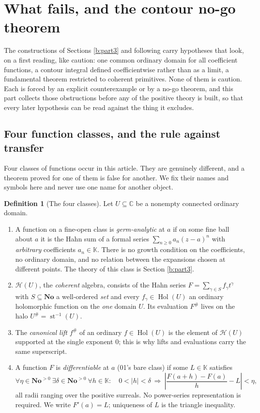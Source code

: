 \documentclass[11pt,a4paper]{article}
\numberwithin{equation}{section}
\theoremstyle{definition}
\newtheorem{definition}[theorem]{Definition}
\theoremstyle{remark}
\theoremstyle{plain}
\newcommand{\K}{\mathbb K}
\newcommand{\No}{\mathbf{No}}
\newcommand{\CC}{\mathbb C}
\DeclareMathOperator{\Hol}{Hol}
\DeclareMathOperator{\st}{st}
\newcommand{\tm}{t}
\newcommand{\halo}[1]{#1^{\#}}
\newcommand{\ev}[1]{#1^{\#}}
\newcommand{\Hc}{\mathcal H}
\newcommand{\abs}[1]{\lvert #1\rvert}
\begin{document}
\section{What fails, and the contour no-go theorem}
\label{b:part2}

The constructions of Sections \ref{b:part3} and following carry hypotheses
that look, on a first reading, like caution: one common ordinary domain
for all coefficient functions, a contour integral defined coefficientwise
rather than as a limit, a fundamental theorem restricted to coherent
primitives. None of them is caution. Each is forced by an explicit
counterexample or by a no-go theorem, and this part collects those
obstructions before any of the positive theory is built, so that every
later hypothesis can be read against the thing it excludes.

\subsection{Four function classes, and the rule against transfer}
\label{b:classes}

Four classes of functions occur in this article. They are genuinely
different, and a theorem proved for one of them is false for another.
We fix their names and symbols here and never use one name for another
object.

\begin{definition}[The four classes]
\label{b:def-classes}
Let $U\subseteq\CC$ be a nonempty connected ordinary domain.
\begin{enumerate}[label=\textup{(\alph*)},leftmargin=2.4em]
\item A function on a fine-open class is \emph{germ-analytic} at $a$ if
on some fine ball about $a$ it is the Hahn sum of a formal series
$\sum_{n\ge0}a_n(z-a)^n$ with \emph{arbitrary} coefficients $a_n\in\K$.
There is no growth condition on the coefficients, no ordinary domain, and
no relation between the expansions chosen at different points. The theory
of this class is Section \ref{b:part3}.
\item $\Hc(U)$, the \emph{coherent} algebra, consists of the Hahn series
$F=\sum_{\gamma\in S}f_\gamma\tm^{\gamma}$ with $S\subseteq\No$ a
well-ordered \emph{set} and every $f_\gamma\in\Hol(U)$ an ordinary
holomorphic function on the \emph{one} domain $U$. Its evaluation
$\ev F$ lives on the halo $\halo U=\st^{-1}(U)$.
\item The \emph{canonical lift} $f^{\#}$ of an ordinary $f\in\Hol(U)$ is
the element of $\Hc(U)$ supported at the single exponent $0$; this is why
lifts and evaluations carry the same superscript.
\item A function $F$ is \emph{differentiable} at $a$ (01's bare class) if
some $L\in\K$ satisfies
\[
 \forall\eta\in\No^{>0}\ \exists\delta\in\No^{>0}\ \forall h\in\K:
 \quad 0<\abs h<\delta\ \Longrightarrow\
 \left\lvert\frac{F(a+h)-F(a)}{h}-L\right\rvert<\eta ,
\]
all radii ranging over the positive surreals. No power-series
representation is required. We write $F'(a)=L$; uniqueness of $L$ is the
triangle inequality.
\end{enumerate}
\end{definition}
\end{document}
